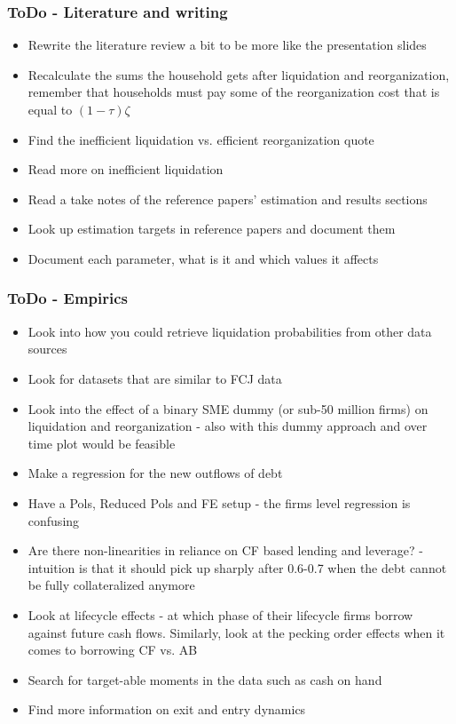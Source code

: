 \documentclass[12pt]{article}
\begin{document}
\newpage

\subsubsection*{ToDo - Literature and writing}
\begin{itemize}\setlength\itemsep{0em} \small
    \item Rewrite the literature review a bit to be more like the presentation slides
    \item Recalculate the sums the household gets after liquidation and reorganization, remember that households must pay some of the reorganization cost that is equal to $(1-\tau)\zeta$
    \item Find the inefficient liquidation vs. efficient reorganization quote \checkmark 
    \item Read more on inefficient liquidation \checkmark
    \item Read a take notes of the reference papers' estimation and results sections \checkmark
    \item Look up estimation targets in reference papers and document them \checkmark
    \item Document each parameter, what is it and which values it affects \checkmark

\end{itemize} \normalsize

\subsubsection*{ToDo - Empirics}
\begin{itemize}\setlength\itemsep{0em} \small
    \item Look into how you could retrieve liquidation probabilities from other data sources \checkmark
    \item Look for datasets that are similar to FCJ data
    \item Look into the effect of a binary SME dummy (or sub-50 million firms) on liquidation and reorganization - also with this dummy approach and over time plot would be feasible \checkmark
    \item Make a regression for the new outflows of debt
    \item Have a Pols, Reduced Pols and FE  setup - the firms level regression is confusing
    \item Are there non-linearities in reliance on CF based lending and leverage? - intuition is that it should pick up sharply after 0.6-0.7 when the debt cannot be fully collateralized anymore
    \item Look at lifecycle effects - at which phase of their lifecycle firms borrow against future cash flows. Similarly, look at the pecking order effects when it comes to borrowing CF vs. AB
    \item Search for target-able moments in the data such as cash on hand
    \item Find more information on exit and entry dynamics
\end{itemize} \normalsize
\end{document}
